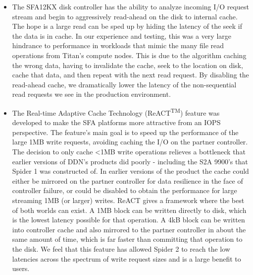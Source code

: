 \begin{itemize}

\item The SFA12KX disk controller has the ability to analyze incoming I/O
request stream and begin to aggressively read-ahead on the disk to internal
cache. The hope is a large read can be sped up by hiding the latency of
the seek if the data is in cache.  In our experience and testing, this was a
very large hindrance to performance in workloads that mimic the many file read
operations from Titan's compute nodes. This is due to the algorithm caching the
wrong data, having to invalidate the cache, seek to the location on disk, cache
that data, and then repeat with the next read request. By disabling the
read-ahead cache, we dramatically lower the latency of the non-sequential read
requests we see in the production environment. 

\item The Real-time Adaptive Cache Technology
(ReACT\textsuperscript{TM}) feature was developed to make the SFA
platforms more attractive from an IOPS perspective. The feature's main goal is
to speed up the performance of the large 1MB write requests, avoiding caching
the I/O on the partner controller. The decision to only cache <1MB write
operations relieves a bottleneck that earlier versions of DDN's products did
poorly - including the S2A 9900's that Spider 1 was constructed of. In earlier
versions of the product the cache could either be mirrored on the partner
controller for data resilience in the face of controller failure, or could
be disabled to obtain the performance for large streaming 1MB (or larger)
writes. ReACT gives a framework where the best of both worlds can exist.  A 1MB
block can be written directly to disk, which is the lowest latency possible for
that operation. A 4kB block can be written into controller cache and also mirrored to
the partner controller in about the same amount of time, which is far faster
than committing that operation to the disk. We feel that this feature has
allowed Spider 2 to reach the low latencies across the spectrum of write
request sizes and is a large benefit to users. 

\end{itemize}


  

